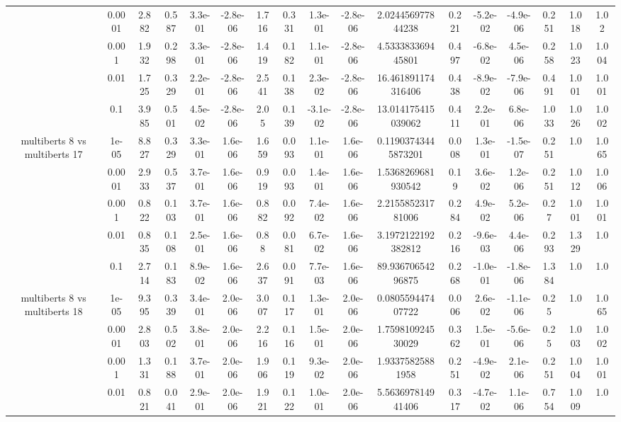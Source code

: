 \begin{tabular}{|c|c|c|c|c|c|c|c|c|c|c|c|c|c|c|c|c|}
 & 0.0001 & 2.882 & 0.587 & 3.3e-01 & -2.8e-06 & 1.716 & 0.331 & 1.3e-01 & -2.8e-06 & 2.024456977844238 & 0.221 & -5.2e-02 & -4.9e-06 & 0.251 & 1.018 & 1.02 \\
 & 0.001 & 1.932 & 0.298 & 3.3e-01 & -2.8e-06 & 1.419 & 0.182 & 1.1e-01 & -2.8e-06 & 4.533383369445801 & 0.497 & -6.8e-02 & 4.5e-06 & 0.258 & 1.023 & 1.004 \\
 & 0.01 & 1.725 & 0.329 & 2.2e-01 & -2.8e-06 & 2.541 & 0.138 & 2.3e-02 & -2.8e-06 & 16.461891174316406 & 0.438 & -8.9e-02 & -7.9e-06 & 0.491 & 1.001 & 1.001 \\
 & 0.1 & 3.985 & 0.501 & 4.5e-02 & -2.8e-06 & 2.05 & 0.139 & -3.1e-02 & -2.8e-06 & 13.014175415039062 & 0.411 & 2.2e-01 & 6.8e-06 & 1.033 & 1.026 & 1.002 \\
\hline
\multirow{5}{*}{multiberts 8 vs multiberts 17} & 1e-05 & 8.827 & 0.329 & 3.3e-01 & 1.6e-06 & 1.659 & 0.093 & 1.1e-01 & 1.6e-06 & 0.11903743445873201 & 0.008 & 1.3e-01 & -1.5e-07 & 0.251 & 1.0 & 1.065 \\
 & 0.0001 & 2.933 & 0.537 & 3.7e-01 & 1.6e-06 & 0.919 & 0.093 & 1.4e-01 & 1.6e-06 & 1.5368269681930542 & 0.19 & 3.6e-02 & 1.2e-06 & 0.251 & 1.012 & 1.006 \\
 & 0.001 & 0.822 & 0.103 & 3.7e-01 & 1.6e-06 & 0.882 & 0.092 & 7.4e-02 & 1.6e-06 & 2.215585231781006 & 0.284 & 4.9e-02 & 5.2e-06 & 0.27 & 1.001 & 1.001 \\
 & 0.01 & 0.835 & 0.108 & 2.5e-01 & 1.6e-06 & 0.88 & 0.081 & 6.7e-02 & 1.6e-06 & 3.1972122192382812 & 0.216 & -9.6e-03 & 4.4e-06 & 0.293 & 1.329 & 1.0 \\
 & 0.1 & 2.714 & 0.183 & 8.9e-02 & 1.6e-06 & 2.637 & 0.091 & 7.7e-03 & 1.6e-06 & 89.93670654296875 & 0.268 & -1.0e-01 & -1.8e-06 & 1.384 & 1.0 & 1.0 \\
\hline
\multirow{5}{*}{multiberts 8 vs multiberts 18} & 1e-05 & 9.395 & 0.339 & 3.4e-01 & 2.0e-06 & 3.007 & 0.117 & 1.3e-01 & 2.0e-06 & 0.080559447407722 & 0.006 & 2.6e-02 & -1.1e-06 & 0.25 & 1.0 & 1.065 \\
 & 0.0001 & 2.803 & 0.502 & 3.8e-01 & 2.0e-06 & 2.216 & 0.116 & 1.5e-01 & 2.0e-06 & 1.759810924530029 & 0.362 & 1.5e-01 & -5.6e-06 & 0.25 & 1.003 & 1.002 \\
 & 0.001 & 1.331 & 0.188 & 3.7e-01 & 2.0e-06 & 1.906 & 0.119 & 9.3e-02 & 2.0e-06 & 1.93375825881958 & 0.251 & -4.9e-02 & 2.1e-06 & 0.251 & 1.004 & 1.001 \\
 & 0.01 & 0.821 & 0.041 & 2.9e-01 & 2.0e-06 & 1.921 & 0.122 & 1.0e-01 & 2.0e-06 & 5.563697814941406 & 0.317 & -4.7e-02 & 1.1e-06 & 0.754 & 1.009 & 1.0 \\

\end{tabular}
